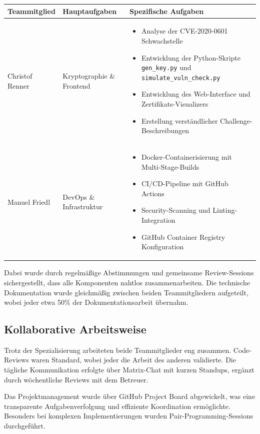 \documentclass{article}
\begin{document}
\begin{longtable}{|p{3cm}|p{5cm}|p{6cm}|}
    \hline
    \textbf{Teammitglied} & \textbf{Hauptaufgaben} & \textbf{Spezifische Aufgaben} \\
    \hline
    \endhead
    
    Christof Renner & Kryptographie \& Frontend & 
    \begin{itemize}
      \item Analyse der CVE-2020-0601 Schwachstelle
      \item Entwicklung der Python-Skripte \texttt{gen\_key.py} und \texttt{simulate\_vuln\_check.py}
      \item Entwicklung des Web-Interface und Zertifikats-Visualizers
      \item Erstellung verständlicher Challenge-Beschreibungen
    \end{itemize} \\
    \hline

    Manuel Friedl & DevOps \& Infrastruktur & 
    \begin{itemize}
      \item Docker-Containerisierung mit Multi-Stage-Builds
      \item CI/CD-Pipeline mit GitHub Actions
      \item Security-Scanning und Linting-Integration
      \item GitHub Container Registry Konfiguration
    \end{itemize} \\
    \hline
    \end{longtable}

\noindent Dabei wurde durch regelmäßige Abstimmungen und gemeinsame Review-Sessions sichergestellt, dass alle Komponenten nahtlos zusammenarbeiten. Die technische Dokumentation wurde gleichmäßig zwischen beiden Teammitgliedern aufgeteilt, wobei jeder etwa 50\% der Dokumentationsarbeit übernahm.

\subsection{Kollaborative Arbeitsweise}

\noindent Trotz der Spezialisierung arbeiteten beide Teammitglieder eng zusammen. Code-Reviews waren Standard, wobei jeder die Arbeit des anderen validierte. Die tägliche Kommunikation erfolgte über Matrix-Chat mit kurzen Standups, ergänzt durch wöchentliche Reviews mit dem Betreuer.

\noindent Das Projektmanagement wurde über GitHub Project Board abgewickelt, was eine transparente Aufgabenverfolgung und effiziente Koordination ermöglichte. Besonders bei komplexen Implementierungen wurden Pair-Programming-Sessions durchgeführt.
\end{document}
